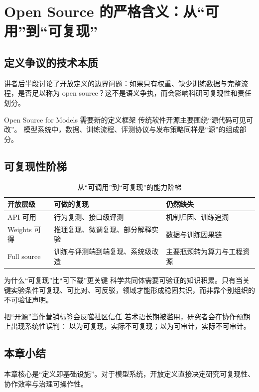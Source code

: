 \section{Open Source 的严格含义：从“可用”到“可复现”}

\subsection{定义争议的技术本质}
讲者后半段讨论了开放定义的边界问题：如果只有权重、缺少训练数据与完整流程，是否足以称为 open source？这不是语义争执，而会影响科研可复现性和责任划分。

\begin{importantbox}{Open Source for Models 需要新的定义框架}
传统软件开源主要围绕“源代码可见可改”。  
模型系统中，数据、训练流程、评测协议与发布策略同样是“源”的组成部分。
\end{importantbox}

\subsection{可复现性阶梯}
\begin{table}[H]
\centering
\begin{tabular}{p{3.0cm}p{3.8cm}p{4.8cm}}
\toprule
\textbf{开放层级} & \textbf{可做的复现} & \textbf{仍然缺失} \\
\midrule
API 可用 & 行为复测、接口级评测 & 机制归因、训练追溯 \\
Weights 可得 & 推理复现、微调复现、部分解释实验 & 数据与训练因果链 \\
Full source & 训练与评测端到端复现、系统级改造 & 主要瓶颈转为算力与工程资源 \\
\bottomrule
\end{tabular}
\caption{从“可调用”到“可复现”的能力阶梯}
\end{table}

\begin{knowledgebox}{为什么“可复现”比“可下载”更关键}
科学共同体需要可验证的知识积累。只有当关键实验条件可复现、可比对、可反驳，领域才能形成稳固共识，而非靠个别组织的不可验证声明。
\end{knowledgebox}

\begin{warningbox}{把“开源”当作营销标签会反噬社区信任}
若术语长期被滥用，研究者会在协作预期上出现系统性误判：  
以为可复现，实际不可复现；以为可审计，实际不可审计。
\end{warningbox}

\subsection{本章小结}
本章核心是“定义即基础设施”。对于模型系统，开放定义直接决定研究可复现性、协作效率与治理可操作性。


